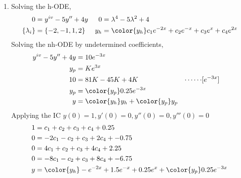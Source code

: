 \begin{enumerate}
    \item Solving the h-ODE,
          \begin{align}
              0               & = y^{iv} - 5y'' + 4y                   &
              0               & = \lambda^{4} - 5\lambda^{2} + 4         \\
              \{\lambda_{i}\} & = \{-2, -1, 1, 2\}                     &
              y_{h}           & = \color{y_h} c_1 e^{-2x} + c_2 e^{-x}
              + c_3 e^{x} + c_4 e^{2x}
          \end{align}
          Solving the nh-ODE by undetermined coefficients,
          \begin{align}
              y^{iv} - 5y'' + 4y & = 10e^{-3x}                                   \\
              y_{p}              & = Ke^{3x}                                     \\
              10                 & = 81K - 45K + 4K                            &
              \cdots\cdots       & [e^{-3x}]                                     \\
              y_{p}              & = \color{y_p} 0.25e^{-3x}                     \\
              y                  & = {\color{y_h} y_{h}} + {\color{y_p} y_{p}}
          \end{align}
          Applying the IC $ y(0) = 1, y'(0) = 0, y''(0) = 0, y'''(0) = 0 $
          \begin{align}
              1 & = c_1 + c_2 + c_3 + c_4 + 0.25                   \\
              0 & = -2c_1 - c_2 + c_3 + 2c_4 + -0.75               \\
              0 & = 4c_1 + c_2 + c_3 + 4c_4 + 2.25                 \\
              0 & = -8c_1 - c_2 + c_3 + 8c_4 + -6.75               \\
              y & = {\color{y_h} -e^{-2x} + 1.5e^{-x} + 0.25e^{x}}
              + {\color{y_p} 0.25e^{-3x}}
          \end{align}
          \begin{figure}[H]
              \centering
          \end{figure}


\end{enumerate}
